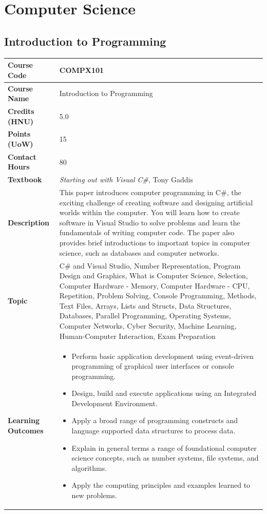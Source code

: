 \documentclass{article}
\begin{document}
\clearpage

\section{Computer Science}

\subsection[COMPX101 Introduction to Programming]{Introduction to Programming}
\renewcommand{\arraystretch}{1.5} %
\begin{longtable}{|p{3cm}|p{10cm}|}
\hline
\textbf{Course Code} & COMPX101 \\
\hline
\textbf{Course Name} & Introduction to Programming \\
\hline
\textbf{Credits (HNU)} & 5.0 \\
\hline
\textbf{Points (UoW)} & 15 \\
\hline
\textbf{Contact Hours} & 80 \\
\hline
\textbf{Textbook} & \emph{Starting out with Visual C\#}, Tony Gaddis \\
\hline
\textbf{Description} & This paper introduces computer programming in C\#, the exciting challenge of creating software and designing artificial worlds within the computer. You will learn how to create software in Visual Studio to solve problems and learn the fundamentals of writing computer code. The paper also provides brief introductions to important topics in computer science, such as databases and computer networks.\\
\hline
\textbf{Topic} & C\# and Visual Studio, 
Number Representation, 
Program Design and Graphics, 
What is Computer Science, 
Selection, 
Computer Hardware - Memory, 
Computer Hardware - CPU, 
Repetition, 
Problem Solving, 
Console Programming, 
Methods, 
Text Files, 
Arrays, 
Lists and Structs, 
Data Structures, 
Databases, 
Parallel Programming, 
Operating Systems, 
Computer Networks, 
Cyber Security, 
Machine Learning, 
Human-Computer Interaction, 
Exam Preparation\\
\hline
\textbf{Learning Outcomes} & 
    \begin{itemize}
        \item Perform basic application development using event-driven programming of graphical user interfaces or console programming. 
        \item Design, build and execute applications using an Integrated Development Environment. 
        \item Apply a broad range of programming constructs and language supported data structures to process data. 
        \item Explain in general terms a range of foundational computer science concepts, such as number systems, file systems, and algorithms. 
        \item Apply the computing principles and examples learned to new problems. 
    \end{itemize} \\
\hline
\end{longtable}
\end{document}
